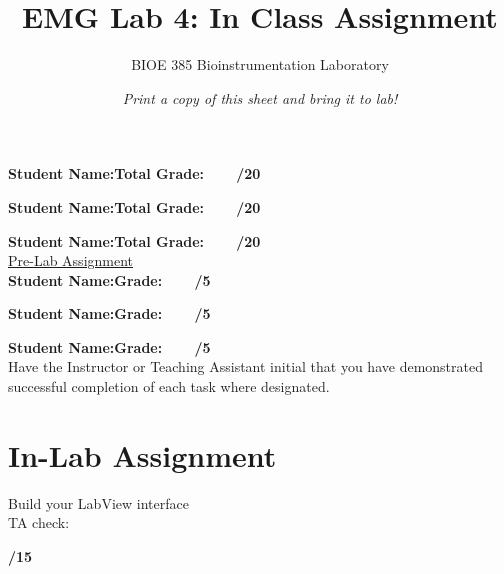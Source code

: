 \documentclass{article}
\title{EMG Lab 4: In Class Assignment}
\author{BIOE 385 Bioinstrumentation Laboratory}
\date{\textit{Print a copy of this sheet and bring it to lab!}}
\begin{document}
\large
\maketitle

\textbf{Student Name:}\hfill 	\textbf{Total Grade:\ \ \ \ /20}\vspace{0.5cm}

\textbf{Student Name:}\hfill 	\textbf{Total Grade:\ \ \ \ /20}\vspace{0.5cm}

\textbf{Student Name:}\hfill 	\textbf{Total Grade:\ \ \ \ /20}\\

\underline{Pre-Lab Assignment}\\

\textbf{Student Name:}\hfill 	\textbf{Grade:\ \ \ \ /5}\vspace{0.5cm}

\textbf{Student Name:}\hfill 	\textbf{Grade:\ \ \ \ /5}\vspace{0.5cm}

\textbf{Student Name:}\hfill 	\textbf{Grade:\ \ \ \ /5}\\

Have the Instructor or Teaching Assistant initial that you have demonstrated successful completion of each task where designated.

\section*{In-Lab Assignment}
Build your LabView interface
\\TA check: \underline{\hspace{2cm}}

\hfill \textbf{\underline{\hspace{1cm}}/15}
\end{document}
